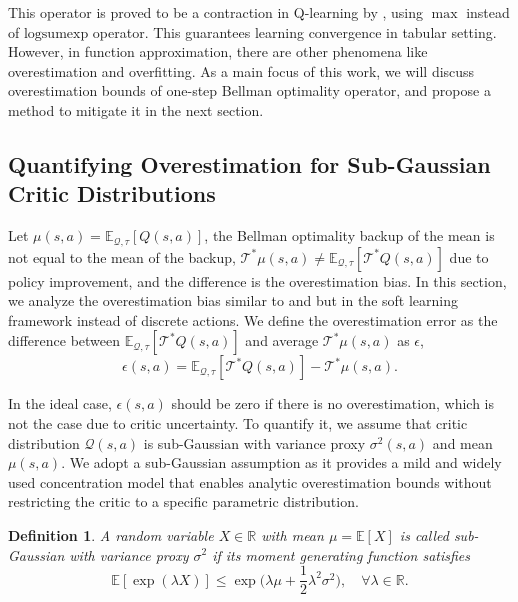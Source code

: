 \documentclass{article}
\newtheorem{definition}{Definition}[section]
\begin{document}
This operator is proved to be a contraction in Q-learning by \citet{achab2023one}, using $\max$ instead of $\text{logsumexp}$ operator. This guarantees learning convergence in tabular setting. However, in function approximation, there are other phenomena like overestimation and overfitting. As a main focus of this work, we will discuss overestimation bounds of one-step Bellman optimality operator, and propose a method to mitigate it in the next section. 

\subsection{Quantifying Overestimation for Sub-Gaussian Critic Distributions}

Let $\mu(s,a) = \mathbb{E}_{\mathcal{Q}, \tau} [ Q(s,a) ]$, the Bellman optimality backup of the mean is not equal to the mean of the backup, $\mathcal{T}^{*} \mu(s,a) \neq \mathbb{E}_{\mathcal{Q}, \tau} [ \mathcal{T}^{*} Q(s,a) ]$ due to policy improvement, and the difference is the overestimation bias. In this section, we analyze the overestimation bias similar to \citet{chen2021randomized} and \citet{lan2020maxmin} but in the soft learning framework instead of discrete actions. We define the overestimation error as the difference between $\mathbb{E}_{\mathcal{Q}, \tau} [ \mathcal{T}^{*} Q(s,a) ]$ and average $\mathcal{T}^{*} \mu(s,a)$ as $\epsilon$, 
\begin{equation}
	\epsilon(s,a) = \mathbb{E}_{\mathcal{Q}, \tau} [ \mathcal{T}^{*} Q(s,a) ] - \mathcal{T}^{*} \mu(s,a). 
\end{equation}

In the ideal case, $\epsilon(s,a)$ should be zero if there is no overestimation, which is not the case due to critic uncertainty. To quantify it, we assume that critic distribution $\mathcal{Q}(s, a)$ is sub-Gaussian with variance proxy $\sigma^2(s,a)$ and mean $\mu(s,a)$. We adopt a sub-Gaussian assumption as it provides a mild and widely used concentration model that enables analytic overestimation bounds without restricting the critic to a specific parametric distribution.

\begin{definition}
	\label{defn:subgauss}
	A random variable $X \in \mathbb{R}$ with mean $\mu=\mathbb{E}[X]$ is called sub-Gaussian with variance proxy $\sigma^2$ if its moment generating function satisfies
	\begin{equation}
		\mathbb{E}[\exp(\lambda X)] \leq \exp \big( \lambda \mu + \frac{1}{2} \lambda^2 \sigma^2 \big), \quad \forall \lambda \in \mathbb{R}. 
	\end{equation}
\end{definition}
\end{document}
